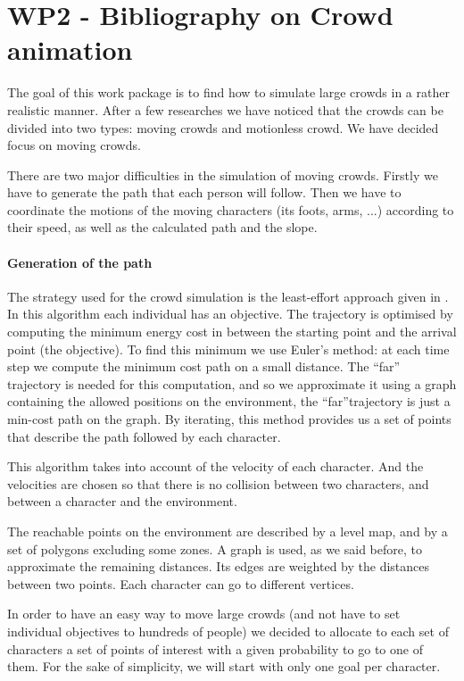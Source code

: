 \section{WP2 - Bibliography on Crowd animation}

The goal of this work package is to find how to simulate large crowds in a rather realistic manner. After a few researches we have noticed that the crowds can be divided into two types: moving crowds and motionless crowd. We have decided focus on moving crowds. 

There are two major difficulties in the simulation of moving crowds. Firstly we have to generate the path that each person will follow. Then we have to coordinate the motions of the moving characters (its foots, arms, ...) according to their speed, as well as the calculated path and the slope.


\paragraph{Generation of the path}

The strategy used for the crowd simulation is the least-effort approach given in \cite{PLE}.\\

In this algorithm each individual has an objective. The trajectory is optimised by computing the minimum energy cost in between the starting point and the arrival point (the objective). To find this minimum we use Euler's method: at each time step we compute the minimum cost path on a small distance. The ``far'' trajectory is needed for this computation, and so we approximate it using a graph containing the allowed positions on the environment, the ``far''trajectory is just a min-cost path on the graph. By iterating, this method provides us a set of points that describe the path followed by each character.

This algorithm takes into account of the velocity of each character. And the velocities are chosen so that there is no collision between two characters, and between a character and the environment.

The reachable points on the environment are described by a level map, and by a set of polygons excluding some zones. A graph is used, as we said before, to approximate the remaining distances. Its edges are weighted by the distances between two points. Each character can go to different vertices.

In order to have an easy way to move large crowds (and not have to set individual objectives to hundreds of people) we decided to allocate to each set of characters a set of points of interest with a given probability to go to one of them. For the sake of simplicity, we will start with only one goal per character.

